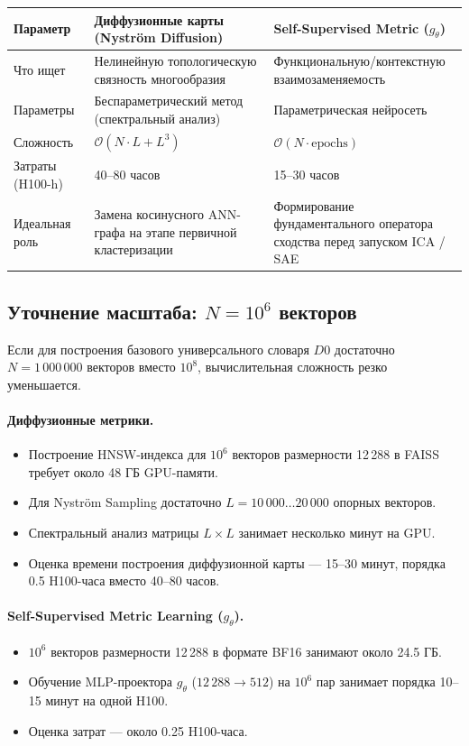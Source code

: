 \documentclass[11pt,a4paper]{article}
\begin{document}
\begin{table}[H]
\centering
\small
\begin{tabular}{p{3.0cm} p{5.7cm} p{5.7cm}}
\toprule
\textbf{Параметр} & \textbf{Диффузионные карты (Nyström Diffusion)} & \textbf{Self-Supervised Metric ($g_\theta$)} \\
\midrule
Что ищет & Нелинейную топологическую связность многообразия & Функциональную/контекстную взаимозаменяемость \\
Параметры & Беспараметрический метод (спектральный анализ) & Параметрическая нейросеть \\
Сложность & $\mathcal{O}(N\cdot L+L^3)$ & $\mathcal{O}(N\cdot\text{epochs})$ \\
Затраты (H100-h) & 40--80 часов & 15--30 часов \\
Идеальная роль & Замена косинусного ANN-графа на этапе первичной кластеризации & Формирование фундаментального оператора сходства перед запуском ICA / SAE \\
\bottomrule
\end{tabular}
\end{table}

\subsection*{Уточнение масштаба: $N=10^6$ векторов}

Если для построения базового универсального словаря $D0$ достаточно $N=1\,000\,000$ векторов вместо $10^8$, вычислительная сложность резко уменьшается.

\paragraph{Диффузионные метрики.}
\begin{itemize}
    \item Построение HNSW-индекса для $10^6$ векторов размерности 12\,288 в FAISS требует около 48 ГБ GPU-памяти.
    \item Для Nyström Sampling достаточно $L=10\,000\ldots20\,000$ опорных векторов.
    \item Спектральный анализ матрицы $L\times L$ занимает несколько минут на GPU.
    \item Оценка времени построения диффузионной карты — 15--30 минут, порядка 0.5 H100-часа вместо 40--80 часов.
\end{itemize}

\paragraph{Self-Supervised Metric Learning ($g_\theta$).}
\begin{itemize}
    \item $10^6$ векторов размерности 12\,288 в формате BF16 занимают около 24.5 ГБ.
    \item Обучение MLP-проектора $g_\theta$ ($12\,288\rightarrow512$) на $10^6$ пар занимает порядка 10--15 минут на одной H100.
    \item Оценка затрат — около 0.25 H100-часа.
\end{itemize}
\end{document}
